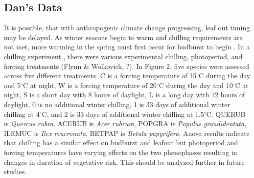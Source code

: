 \documentclass{article}\usepackage[]{graphicx}\usepackage[]{color}
\begin{document}
\subsection*{Dan's Data}
It is possible, that with anthropogenic climate change progressing, leaf out timing may be delayed. As winter seasons begin to warm and chilling requirements are not met, more warming in the spring must first occur for budburst to begin \citep{Chuine2010, Polgar2014, Fu2012, Morin2009, McCreary1990}. In a chilling experiment , there were various experimental chilling, photoperiod, and forcing treatments (Flynn \& Wolkovich, ?). In Figure 2, five species were assessed across five different treatments. C is a forcing temperature of 15$^{\circ}$C during the day and 5$^{\circ}$C at night, W is a forcing temperature of 20$^{\circ}$C during the day and 10$^{\circ}$C at night, S is a short day with 8 hours of daylight, L is a long day with 12 hours of daylight, 0 is no additional winter chilling, 1 is 33 days of additional winter chilling at 4$^{\circ}$C, and 2 is 33 days of additional winter chilling at 1.5$^{\circ}$C. QUERUB is \textit{Quercus rubra}, ACERUB is \textit{Acer rubrum}, POPGRA is \textit{Populus grandidentata}, ILEMUC is \textit{Ilex mucronata}, BETPAP is \textit{Betula papyrifera}. Anova results indicate that chilling has a similar effect on budburst and leafout but photoperiod and forcing temperatures have varying effects on the two phenophases resulting in changes in duration of vegetative risk. This should be analyzed further in future studies. 
\end{document}
